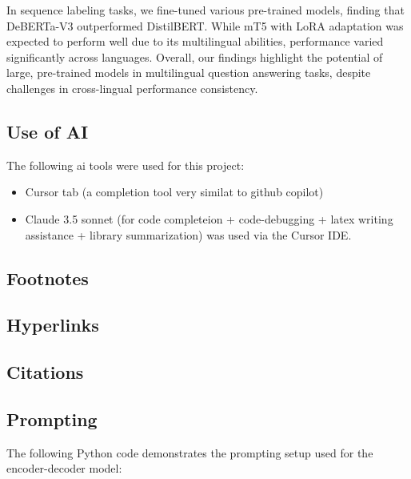 \documentclass[11pt]{article}
\begin{document}
In sequence labeling tasks, we fine-tuned various pre-trained models, finding that DeBERTa-V3 outperformed DistilBERT. While mT5 with LoRA adaptation was expected to perform well due to its multilingual abilities, performance varied significantly across languages. Overall, our findings highlight the potential of large, pre-trained models in multilingual question answering tasks, despite challenges in cross-lingual performance consistency.

\subsection{Use of AI}
The following ai tools were used for this project:

\begin{itemize}
    \item Cursor tab (a completion tool very similat to github copilot)
    \item Claude 3.5 sonnet (for code completeion + code-debugging + latex writing assistance + library summarization) was used via the Cursor IDE.
\end{itemize}

\subsection{Footnotes}

\subsection{Hyperlinks}
\subsection{Citations}


\appendix


\subsection{Prompting}
\label{sec:prompting}
The following Python code demonstrates the prompting setup used for the encoder-decoder model:
\end{document}
